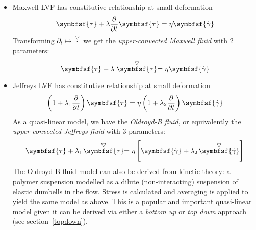 \documentclass{jknotes}
\newcommand{\ucd}[1]{\stackrel{\bigtriangledown}{#1}}
\begin{document}
\begin{eg}
	\begin{itemize}
		\item Maxwell LVF has constitutive relationship at small deformation
			\begin{equation}
				\symbfsf{\tau} + \lambda \frac{\partial}{\partial t}
				\symbfsf{\tau} = \eta \symbfsf{\srate}
			\end{equation}
			Transforming $\partial_t \mapsto \ucd{\cdot}$ we get the
			\emph{upper-convected Maxwell fluid} with 2 parameters:
			\begin{equation}
				\symbfsf{\tau} + \lambda \ucd{\symbfsf{\tau}}
				 = \eta \symbfsf{\srate}
			\end{equation}
		\item Jeffreys LVF has constitutive relationship at small deformation
			\begin{equation}
				\left( 1 + \lambda_1\frac{\partial}{\partial
				t}\right) \symbfsf{\tau}=
				\eta \left( 1 + \lambda_2 \frac{\partial}{\partial t} \right)
				\symbfsf{\srate}
			\end{equation}
			As a quasi-linear model, we have the \emph{Oldroyd-B fluid}, or
			equivalently the \emph{upper-convected Jeffreys fluid} with 3
			parameters:
			\begin{equation}
				\symbfsf{\tau} + \lambda_1\!\ucd{\symbfsf{\tau}} = \eta \left[
				\symbfsf{\srate} + \lambda_2\!\ucd{\symbfsf{\srate}}\right]
			\end{equation}
			The Oldroyd-B fluid model can also be derived from kinetic theory:
			a polymer suspension modelled as a dilute (non-interacting)
			suspension of elastic dumbells in the flow. Stress is calculated
			and averaging is applied to yield the same model as above. This is
			a popular and important quasi-linear model given it can be derived
			via either a \emph{bottom up} or \emph{top down} approach (see
			section~\ref{topdown}).
			\begin{center}
			\end{center}
	\end{itemize}
\end{eg}
\end{document}
